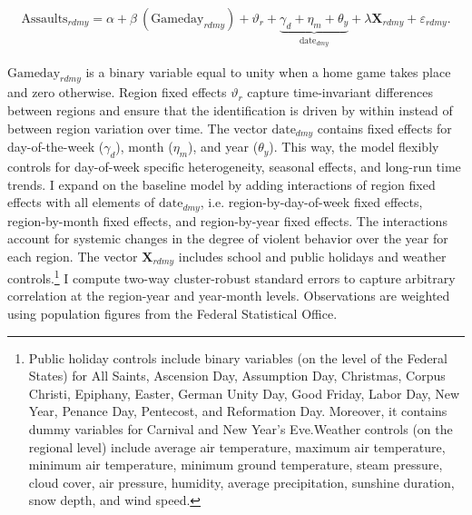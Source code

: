 \begin{align}
\text{Assaults}_{rdmy} = \alpha + \beta\ (\text{Gameday}_{rdmy}) + \vartheta_r + \underbrace{\gamma_d + \eta_m + \theta_y}_{\text{date}_{dmy}} + \lambda \mathbf{X}_{rdmy} + \varepsilon_{rdmy}
\label{eq_soc_ext:model}.
\end{align}

$\text{Gameday}_{rdmy}$ is a binary variable equal to unity when a home game takes place and zero otherwise. Region fixed effects $\vartheta_r$ capture time-invariant differences between regions and ensure that the identification is driven by within instead of between region variation over time. The vector $\text{date}_{dmy}$ contains fixed effects for day-of-the-week ($\gamma_d$), month ($\eta_m$), and year ($\theta_y$). This way, the model flexibly controls for day-of-week specific heterogeneity, seasonal effects, and long-run time trends. I expand on the baseline model by adding interactions of region fixed effects with all elements of $\text{date}_{dmy}$, i.e. region-by-day-of-week fixed effects, region-by-month fixed effects, and region-by-year fixed effects. The interactions account for systemic changes in the degree of violent behavior over the year for each region. The vector $\mathbf{X}_{rdmy}$ includes school and public holidays and weather controls.\footnote{Public holiday controls include binary variables (on the level of the Federal States) for All Saints, Ascension Day, Assumption Day, Christmas, Corpus Christi, Epiphany, Easter, German Unity Day, Good Friday, Labor Day, New Year, Penance Day, Pentecost, and Reformation Day. Moreover, it contains dummy variables for Carnival and New Year's Eve.\newline Weather controls (on the regional level) include average air temperature, maximum air temperature, minimum air temperature, minimum ground temperature, steam pressure, cloud cover, air pressure, humidity, average precipitation, sunshine duration, snow depth, and wind speed.} I compute two-way cluster-robust standard errors to capture arbitrary correlation at the region-year and year-month levels. Observations are weighted using population figures from the Federal Statistical Office.


